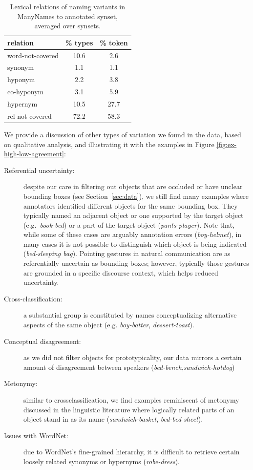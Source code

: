 \begin{table}
\small
\centering
\begin{tabular}{lcc}
\toprule
         relation & \% types & \% token \\
\midrule
 word-not-covered &  10.6 &  2.6 \\
\midrule
 synonym &  1.1 &  1.1 \\
 hyponym &  2.2 &  3.8 \\
 co-hyponym &  3.1 &  5.9 \\
 hypernym &  10.5 &  27.7 \\
 rel-not-covered &  72.2 &  58.3 \\
\bottomrule
\end{tabular}
\caption{Lexical relations of naming variants in ManyNames to annotated \vgenome synset, averaged over synsets.}
\label{tab:rel}
\end{table}

We provide a discussion of other types of variation we found in the data, based on qualitative analysis, and illustrating it with the examples in Figure \ref{fig:ex-high-low-agreement}:

\begin{description}
\item[Referential uncertainty:] despite our care in filtering out objects that are occluded or have unclear bounding boxes (see Section~\ref{sec:data}), we still find many examples where annotators identified different objects for the same bounding box. They typically named an adjacent object or one supported by the target object (e.g.\ \textit{book-bed}) or a part of the target object (\textit{pants-player}).
Note that, while some of these cases are arguably annotation errors (\textit{boy-helmet}), in many cases it is not possible to distinguish which object is being indicated (\textit{bed-sleeping bag}). Pointing gestures in natural communication are as referentially uncertain as bounding boxes; however, typically those gestures are grounded in a specific discourse context, which helps reduced uncertainty.
\item[Cross-classification:] a substantial group is constituted by names conceptualizing alternative aspects of the same object (e.g. \textit{boy-batter}, \textit{dessert-toast}).
\item[Conceptual disagreement:] as we did not filter objects for prototypicality, our data mirrors a certain amount of disagreement between speakers (\textit{bed-bench},\textit{sandwich-hotdog})
\item[Metonymy:] similar to crossclassification, we find examples reminiscent of metonymy discussed in the linguistic literature \cite{pustejovsky1991generative} where logically related parts of an object stand in as its name (\textit{sandwich-basket}, \textit{bed-bed sheet}). 
\item[Issues with WordNet:] due to WordNet's fine-grained hierarchy, it is difficult to retrieve certain loosely related synonyms or hypernyms (\textit{robe-dress}).
\end{description}

